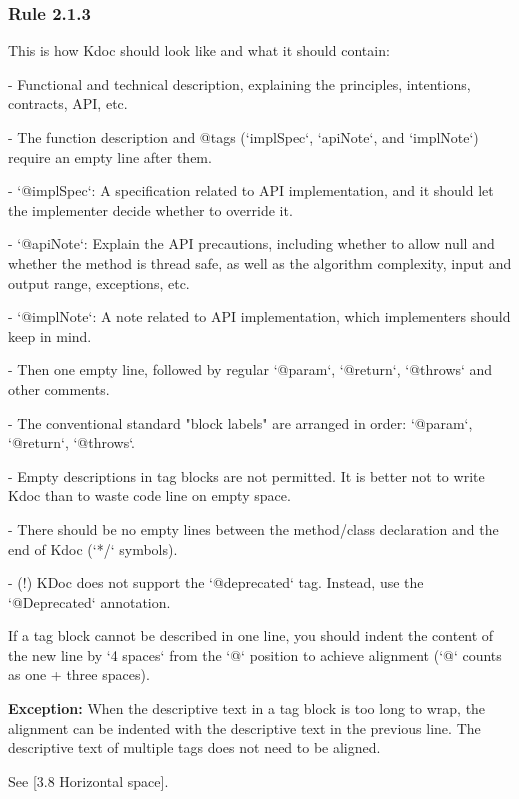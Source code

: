 \subsubsection*{\textbf{Rule 2.1.3}}
\leavevmode\newline



This is how Kdoc should look like and what it should contain:

- Functional and technical description, explaining the principles, intentions, contracts, API, etc.

- The function description and @tags (`implSpec`, `apiNote`, and `implNote`) require an empty line after them.

- `@implSpec`: A specification related to API implementation, and it should let the implementer decide whether to override it.

- `@apiNote`: Explain the API precautions, including whether to allow null and whether the method is thread safe, as well as the algorithm complexity, input and output range, exceptions, etc.

- `@implNote`: A note related to API implementation, which implementers should keep in mind.

- Then one empty line, followed by regular `@param`, `@return`, `@throws` and other comments.

- The conventional standard "block labels" are arranged in order: `@param`, `@return`, `@throws`.

- Empty descriptions in tag blocks are not permitted. It is better not to write Kdoc than to waste code line on empty space.

- There should be no empty lines between the method/class declaration and the end of Kdoc (`*/` symbols).

- (!) KDoc does not support the `@deprecated` tag. Instead, use the `@Deprecated` annotation.



If a tag block cannot be described in one line, you should indent the content of the new line by `4 spaces` from the `@` position to achieve alignment (`@` counts as one + three spaces).



\textbf{Exception:} When the descriptive text in a tag block is too long to wrap, the alignment can be indented with the descriptive text in the previous line. The descriptive text of multiple tags does not need to be aligned.

See [3.8 Horizontal space].



